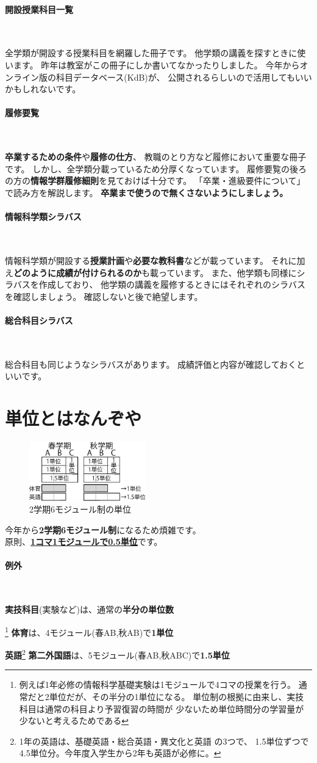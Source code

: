 \documentclass[a4j]{jsarticle}
\newcommand{\note}[1]{{\color{red} #1}}
\newcommand{\RA}{{\color{red}\large RED ALERT}}
\newcommand{\bold}[1]{{\bfseries #1}}
\newcommand{\parapara}[1]{\paragraph{#1}~\par}
\newcommand{\bparapara}[1]{\parapara{\bold{#1}}}
\renewcommand{\note}[1]{}\renewcommand{\RA}{}
\begin{document}
\bparapara{開設授業科目一覧}
全学類が開設する授業科目を網羅した冊子です。
他学類の講義を探すときに使います。
昨年は教室がこの冊子にしか書いてなかったりしました。
今年からオンライン版の科目データベース(KdB)が、
公開されるらしいので活用してもいいかもしれないです。
\bparapara{履修要覧}
\bold{卒業するための条件}や\bold{履修の仕方}、
教職のとり方など履修において重要な冊子です。
しかし、全学類分載っているため分厚くなっています。
履修要覧の後ろの方の\bold{情報学群履修細則}を見ておけば十分です。
「卒業・進級要件について」で読み方を解説します。
\bold{卒業まで使うので無くさないようにしましょう。}
\bparapara{情報科学類シラバス}
情報科学類が開設する\bold{授業計画}や\bold{必要な教科書}などが載っています。
それに加え\bold{どのように成績が付けられるのか}も載っています。
また、他学類も同様にシラバスを作成しており、
他学類の講義を履修するときにはそれぞれのシラバスを確認しましょう。
確認しないと後で絶望します。
\bparapara{総合科目シラバス}
総合科目も同じようなシラバスがあります。
成績評価と内容が確認しておくといいです。



\section{単位とはなんぞや}

\begin{figure}
\begin{flushright}
	\vspace{-15mm}
	\includegraphics[width=0.45\textwidth,clip,keepaspectratio]{pic/01-introduction/tani.eps}
	\caption{2学期6モジュール制の単位}
\end{flushright}
\end{figure}
今年から\bold{2学期6モジュール制}になるため煩雑です。\note{面倒}
\\原則、\underline{\large\bf {\Large 1}コマ{\Large 1}モジュールで{\Large 0.5}単位}です。\\

\bparapara{例外}
\bold{実技科目}(実験など)は、通常の\bold{半分の単位数}\par
\footnote{例えば1年必修の情報科学基礎実験は1モジュールで4コマの授業を行う。
通常だと2単位だが、その半分の1単位になる。
単位制の根拠に由来し、実技科目は通常の科目より予習復習の時間が
少ないため単位時間分の学習量が少ないと考えるためである}
\bold{体育}は、4モジュール{\small (春AB,秋AB)}で\bold{1単位}\par
\bold{英語}\footnote{1年の英語は、基礎英語・総合英語・異文化と英語 の3つで、
1.5単位ずつで4.5単位分。今年度入学生から2年も英語が必修に。}
\bold{第二外国語}は、5モジュール{\footnotesize (春AB,秋ABC)}で\bold{1.5単位}
\end{document}
